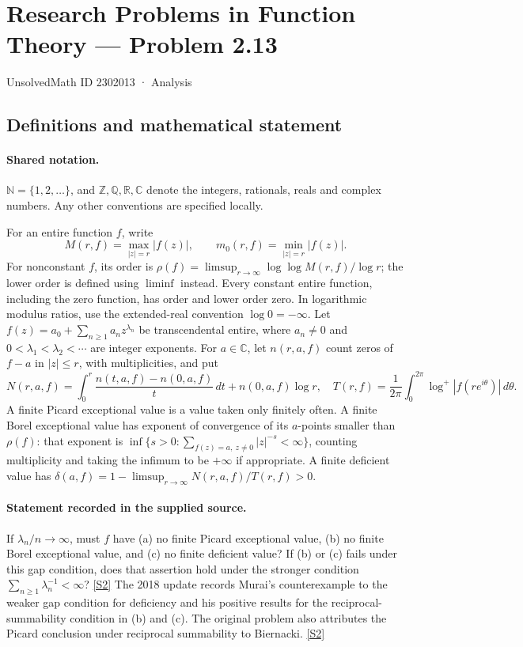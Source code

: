 \documentclass[11pt]{article}
\newcommand{\sref}[2]{\hyperlink{source:#1:#2}{[S#2]}}
\begin{document}
\setcounter{section}{2302012}
\section{Research Problems in Function Theory — Problem 2.13}\label{2302013}
{\small\sffamily UnsolvedMath ID 2302013 · Analysis}
\subsection{Definitions and mathematical statement}

\paragraph{Shared notation.}$\mathbb N=\{1,2,\ldots\}$, and $\mathbb Z,\mathbb Q,\mathbb R,\mathbb C$ denote the integers, rationals, reals and complex numbers. Any other conventions are specified locally.


For an entire function $f$, write
\[
 M(r,f)=\max_{|z|=r}|f(z)|,\qquad m_0(r,f)=\min_{|z|=r}|f(z)|.
\]
For nonconstant $f$, its order is $\rho(f)=\limsup_{r\to\infty}\log\log M(r,f)/\log r$;
the lower order is defined using $\liminf$ instead. Every constant entire function, including the zero function, has order and lower order zero. In logarithmic modulus ratios, use the extended-real convention $\log0=-\infty$.
Let $f(z)=a_0+\sum_{n\ge1}a_nz^{\lambda_n}$ be transcendental entire,
where $a_n\ne0$ and $0<\lambda_1<\lambda_2<\cdots$ are integer exponents.
For $a\in\mathbb C$, let $n(r,a,f)$ count zeros of $f-a$ in $|z|\le r$, with multiplicities, and put
\[
 N(r,a,f)=\int_0^r\frac{n(t,a,f)-n(0,a,f)}{t}\,dt+n(0,a,f)\log r,
 \quad T(r,f)=\frac1{2\pi}\int_0^{2\pi}\log^+|f(re^{i\theta})|\,d\theta.
\]
A finite Picard exceptional value is a value taken only finitely often. A finite Borel exceptional value
has exponent of convergence of its $a$-points smaller than $\rho(f)$: that exponent is
$\inf\{s>0:\sum_{f(z)=a,\ z\ne0}|z|^{-s}<\infty\}$, counting multiplicity and taking the infimum to be $+\infty$ if appropriate.
A finite deficient value has $\delta(a,f)=1-\limsup_{r\to\infty}N(r,a,f)/T(r,f)>0$.

\paragraph{Statement recorded in the supplied source.}
If $\lambda_n/n\to\infty$, must $f$ have (a) no finite Picard exceptional value,
(b) no finite Borel exceptional value, and (c) no finite deficient value?
If (b) or (c) fails under this gap condition, does that assertion hold under the stronger condition
$\sum_{n\ge1}\lambda_n^{-1}<\infty$? \sref{2302013}{2}
The 2018 update records Murai's counterexample to the weaker gap condition for deficiency and his positive results for the reciprocal-summability condition in (b) and (c). The original problem also attributes the Picard conclusion under reciprocal summability to Biernacki. \sref{2302013}{2}
\end{document}
